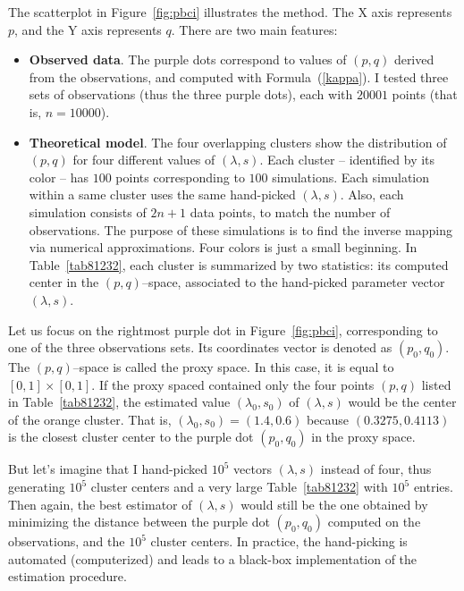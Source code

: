 \documentclass[10pt]{article}
\begin{document}
\noindent The scatterplot in Figure~\ref{fig:pbci} illustrates the method. The X axis represents $p$, and the Y axis represents $q$. There are two main features:
\begin{itemize}
\item {\bf Observed data}. The purple dots correspond to values of $(p,q)$ derived from the observations, and
 computed with Formula~(\ref{kappa}). I tested three sets of observations (thus the three purple dots), each with $\num{20001}$ points (that is, $n=\num{10000}$).

\item {\bf Theoretical model}. The four overlapping clusters show the distribution of $(p,q)$ for four different values
of $(\lambda,s)$. Each cluster -- identified by its color -- has $100$ points corresponding to $100$ simulations. Each simulation within a same cluster uses
the same hand-picked $(\lambda,s)$. Also, each  simulation consists of $2n+1$ data points, to match the number of observations. The purpose of these simulations is to find the inverse mapping via numerical approximations. Four colors is just a small beginning. In  Table~\ref{tab81232}, each cluster is summarized by two statistics: its computed center in the $(p,q)$--space, associated to the hand-picked parameter vector $(\lambda,s)$.
\end{itemize}

\noindent Let us focus on the rightmost purple dot in Figure~\ref{fig:pbci}, corresponding to one of the three observations sets. Its coordinates vector
 is denoted as $(p_0,q_0)$.
The $(p,q)$--space is called the \textcolor{index}{proxy space}. In this case, it is equal to $[0,1]\times [0,1]$. If
the proxy spaced contained only the four points $(p,q)$ listed in Table~\ref{tab81232}, the estimated value $(\lambda_0,s_0)$ of $(\lambda,s)$ would be the center of the orange cluster.  That is, $(\lambda_0,s_0)=(1.4, 0.6)$ because $(0.3275,0.4113)$  is the closest cluster center to the purple dot $(p_0,q_0)$ in the proxy space.

But let's imagine that I hand-picked $10^5$ vectors $(\lambda,s)$ instead of four, thus generating $10^5$ cluster centers and a very large Table~\ref{tab81232} with $10^5$ entries. Then again, the best estimator of $(\lambda,s)$ would still
be the one obtained by minimizing the distance between the purple dot $(p_0,q_0)$ computed on the observations, and the $10^5$ cluster centers. In practice, the hand-picking is automated
(computerized) and leads to a
black-box implementation of the estimation procedure.
\end{document}
